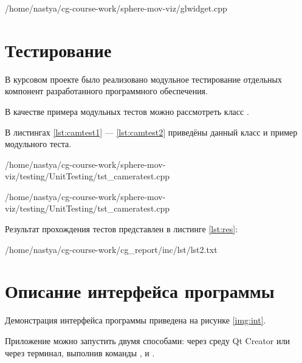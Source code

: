 \begin{lstinputlisting}[
	caption={Создание текстур карт теней},
	label={lst:shadcreate},
	style={cpp},
	linerange={74-92},
	]{/home/nastya/cg-course-work/sphere-mov-viz/glwidget.cpp}
\end{lstinputlisting}

\section{Тестирование}

В курсовом проекте было реализовано модульное тестирование отдельных компонент разработанного программного обеспечения. 

В качестве примера модульных тестов можно рассмотреть класс .

В листингах \ref{lst:camtest1} --- \ref{lst:camtest2} приведёны данный класс и пример модульного теста.

\begin{lstinputlisting}[
	caption={Класс, тестирующий камеру},
	label={lst:camtest1},
	style={cpp},
	linerange={5-17},
	]{/home/nastya/cg-course-work/sphere-mov-viz/testing/UnitTesting/tst_cameratest.cpp}
\end{lstinputlisting}

\begin{lstinputlisting}[
	caption={Пример теста},
	label={lst:camtest2},
	style={cpp},
	linerange={38-45},
	]{/home/nastya/cg-course-work/sphere-mov-viz/testing/UnitTesting/tst_cameratest.cpp}
\end{lstinputlisting}

Результат прохождения тестов представлен в листинге \ref{lst:res}:
\pagebreak
\begin{lstinputlisting}[
	caption={Результат прохождения тестов},
	label={lst:res},
	style={cpp},
	]{/home/nastya/cg-course-work/cg_report/inc/lst/lst2.txt}
\end{lstinputlisting}

\section{Описание интерфейса программы}

Демонстрация интерфейса программы приведена на рисунке \ref{img:int}.


Приложение можно запустить двумя способами: через среду Qt Creator или через терминал, выполнив команды ,  и .

